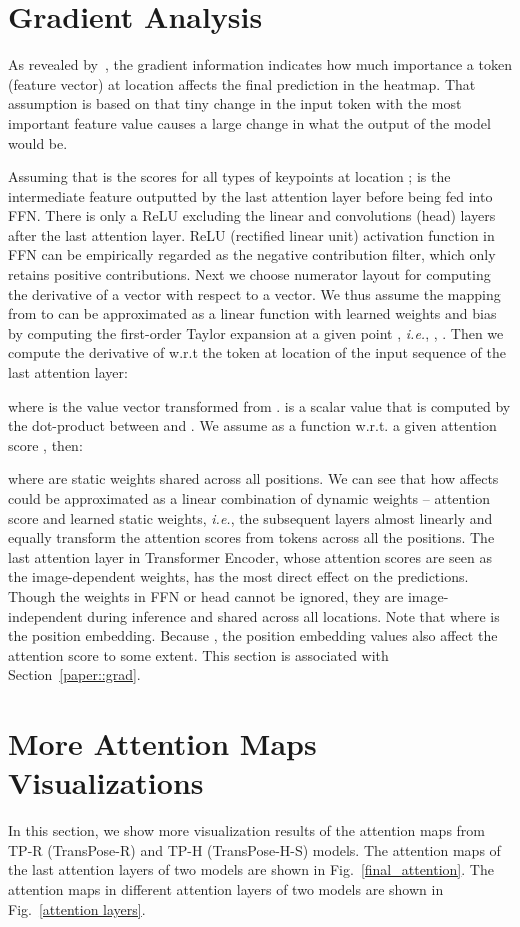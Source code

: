 \documentclass{article}
\begin{document}
\section {Gradient Analysis}
\label{appendix::grad}
As revealed by~\cite{simonyan2013deep, bach2015pixel, selvaraju2017grad}, the gradient information indicates how much importance a token  (feature vector) at location  affects the final prediction in the heatmap. That assumption is based on that tiny change in the input token with the most important feature value causes a large change in what the output of the model would be. 

Assuming that  is the scores for all  types of keypoints at location ;  is the intermediate feature outputted by the last attention layer before being fed into FFN. There is only a ReLU excluding the linear and convolutions (head) layers after the last attention layer. ReLU (rectified linear unit) activation function in FFN can be empirically regarded as the negative contribution filter, which only retains positive contributions. Next we choose numerator layout for computing the derivative of a vector with respect to a vector.  We thus assume the mapping from  to  can be approximated as a linear function  with learned weights  and bias  by computing the first-order Taylor expansion at a given point , \emph{i.e.}, , .   Then we compute the derivative of  w.r.t the token  at location  of the input sequence of the last attention layer:

 where  is the value vector transformed from .  is a scalar value that is computed by the dot-product between  and . We assume  as a function w.r.t. a given attention score , then:

where  are static weights shared across all positions.  We can see that how  affects  could be approximated as a linear combination of dynamic weights -- attention score  and learned static weights, \emph{i.e.}, the subsequent layers almost linearly and equally transform the attention scores from tokens across all the positions. 
The last attention layer in Transformer Encoder, whose attention scores are seen as the image-dependent weights, has the most direct effect on the predictions. Though the weights in FFN or head cannot be ignored, they are image-independent during inference and shared across all locations. Note that  where  is the position embedding. Because , the position embedding values also affect the attention score to some extent.  This section is associated with Section~\ref{paper::grad}.  



\section{More Attention Maps Visualizations}
In this section, we show more visualization results of the attention maps from TP-R (TransPose-R) and TP-H (TransPose-H-S) models. The attention maps of the last attention layers of two models are shown in Fig.~\ref{final_attention}. The attention maps in different attention layers of two models are shown in Fig.~\ref{attention layers}.
\end{document}
